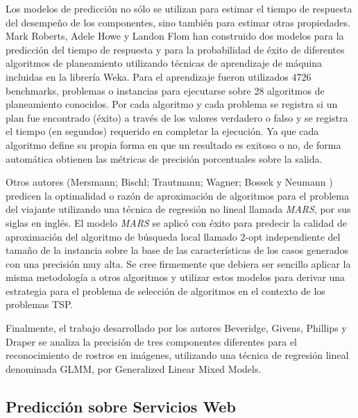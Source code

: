 Los modelos de predicción no sólo se utilizan para estimar el tiempo
de respuesta del desempeño de los componentes, sino también para estimar
otras propiedades. Mark Roberts, Adele Howe y Landon Flom \citep{Roberts07learnedmodels}
han construido dos modelos para la predicción del tiempo de respuesta
y para la probabilidad de éxito de diferentes algoritmos de planeamiento
utilizando técnicas de aprendizaje de máquina incluidas en la librería
Weka. Para el aprendizaje fueron utilizados 4726 benchmarks, problemas
o instancias para ejecutarse sobre 28 algoritmos de planeamiento conocidos.
Por cada algoritmo y cada problema se registra si un plan fue encontrado
(éxito) a través de los valores verdadero o falso y se registra el
tiempo (en segundos) requerido en completar la ejecución. Ya que cada
algoritmo define su propia forma en que un resultado es exitoso o
no, de forma automática obtienen las métricas de precisión porcentuales
sobre la salida. 

Otros autores (Mersmann; Bischl; Trautmann; Wagner; Bossek y Neumann
\citep{Mersmann_anovel}) predicen la optimalidad o razón de aproximación
de algoritmos para el problema del viajante utilizando una técnica
de regresión no lineal llamada \emph{MARS}, por sus siglas en inglés.
El modelo \emph{MARS} se aplicó con éxito para predecir la calidad
de aproximación del algoritmo de búsqueda local llamado 2-opt independiente
del tamaño de la instancia sobre la base de las características de
los casos generados con una precisión muy alta. Se cree firmemente
que debiera ser sencillo aplicar la misma metodología a otros algoritmos
y utilizar estos modelos para derivar una estrategia para el problema
de selección de algoritmos en el contexto de los problemas \ac{TSP}.

Finalmente, el trabajo desarrollado por los autores Beveridge, Givens,
Phillips y Draper \citep{Beveridge2009} se analiza la precisión de
tres componentes diferentes para el reconocimiento de rostros en imágenes,
utilizando una técnica de regresión lineal denominada GLMM, por Generalized
Linear Mixed Models. 


\subsection{Predicción sobre Servicios Web \label{sub:Predicci=0000F3n-sobre-Servicios}}

